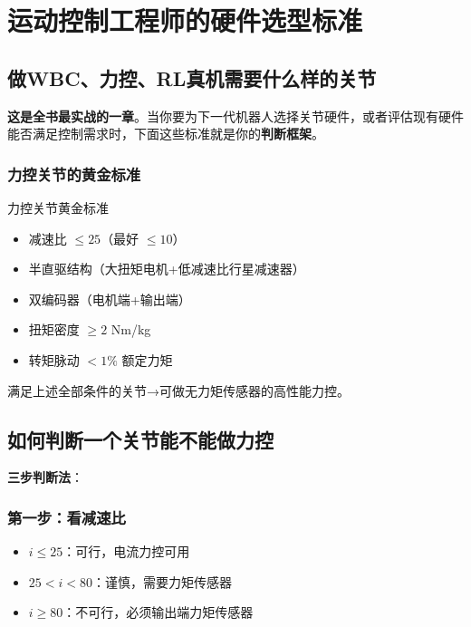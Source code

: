 \chapter{运动控制工程师的硬件选型标准}
\label{ch:selection}

\section{做WBC、力控、RL真机需要什么样的关节}

\textbf{这是全书最实战的一章}。当你要为下一代机器人选择关节硬件，或者评估现有硬件能否满足控制需求时，下面这些标准就是你的\textbf{判断框架}。

\subsection{力控关节的黄金标准}

\begin{keyinsight}{力控关节黄金标准}
\begin{itemize}
  \item 减速比 $\leq 25$（最好 $\leq 10$）
  \item 半直驱结构（大扭矩电机+低减速比行星减速器）
  \item 双编码器（电机端+输出端）
  \item 扭矩密度 $\geq 2$ Nm/kg
  \item 转矩脉动 $< 1\%$ 额定力矩
\end{itemize}
满足上述全部条件的关节→可做无力矩传感器的高性能力控。
\end{keyinsight}

\section{如何判断一个关节能不能做力控}

\textbf{三步判断法}：

\subsection{第一步：看减速比}

\begin{itemize}
  \item $i \leq 25$：\textcolor{successgreen}{可行}，电流力控可用
  \item $25 < i < 80$：\textcolor{infoyellow}{谨慎}，需要力矩传感器
  \item $i \geq 80$：\textcolor{warnred}{不可行}，必须输出端力矩传感器
\end{itemize}


